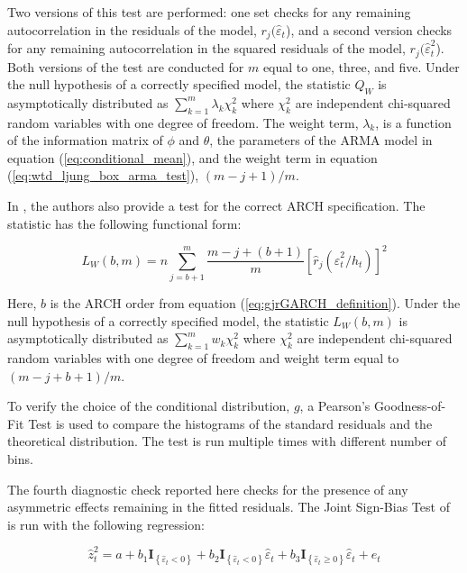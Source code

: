 \documentclass[12pt]{article}
\begin{document}
Two versions of this test are performed: one set checks for any remaining autocorrelation in the residuals of the model, $r_{j}(\hat{\varepsilon}_{t}$), and a second version checks for any remaining autocorrelation in the squared residuals of the model, $r_{j}(\hat{\varepsilon}_{t}^{2}$). Both versions of the test are conducted for $m$ equal to one, three, and five. Under the null hypothesis of a correctly specified model, the statistic $Q_{W}$ is asymptotically distributed as $\sum_{k=1}^{m} \lambda_{k} \chi_{k}^{2}$ where $\chi_{k}^{2}$ are independent chi-squared random variables with one degree of freedom. The weight term, $\lambda_{k}$, is a function of the information matrix of $\phi$ and $\theta$, the parameters of the ARMA model in equation (\ref{eq:conditional_mean}), and the weight term in equation (\ref{eq:wtd_ljung_box_arma_test}), $(m - j + 1) / m$.

In \cite{Fisher_Gallagher_2012}, the authors also provide a test for the correct ARCH specification. The statistic has the following functional form:

\begin{equation}
	L_{W}(b,m) = n \sum_{j=b+1}^{m} \frac{m - j + (b + 1)}{m} [\hat{r}_{j} \left( \hat{\varepsilon}_{t}^{2} / h_{t} \right)]^{2} 
\end{equation}

Here, $b$ is the ARCH order from equation (\ref{eq:gjrGARCH_definition}). Under the null hypothesis of a correctly specified model, the statistic $L_{W}(b,m)$ is asymptotically distributed as $\sum_{k=1}^{m} w_{k} \chi_{k}^{2}$ where $\chi_{k}^{2}$ are independent chi-squared random variables with one degree of freedom and weight term equal to $(m - j + b + 1) / m$.

To verify the choice of the conditional distribution, $g$, a Pearson's Goodness-of-Fit Test is used to compare the histograms of the standard residuals and the theoretical distribution. The test is run multiple times with different number of bins.

The fourth diagnostic check reported here checks for the presence of any asymmetric effects remaining in the fitted residuals. The Joint Sign-Bias Test of \cite{Engle_Ng_1993} is run with the following regression:

\begin{equation}
	\hat{z}_{t}^{2} = a + b_{1} \mathbf{I}_{\left\{\hat{\varepsilon}_{t} < 0 \right\}} + b_{2} \mathbf{I}_{\left\{\hat{\varepsilon}_{t} < 0 \right\}} \hat{\varepsilon}_{t} + b_{3} \mathbf{I}_{\left\{\hat{\varepsilon}_{t} \geq 0 \right\}} \hat{\varepsilon}_{t} + e_{t}
\end{equation}
\end{document}
